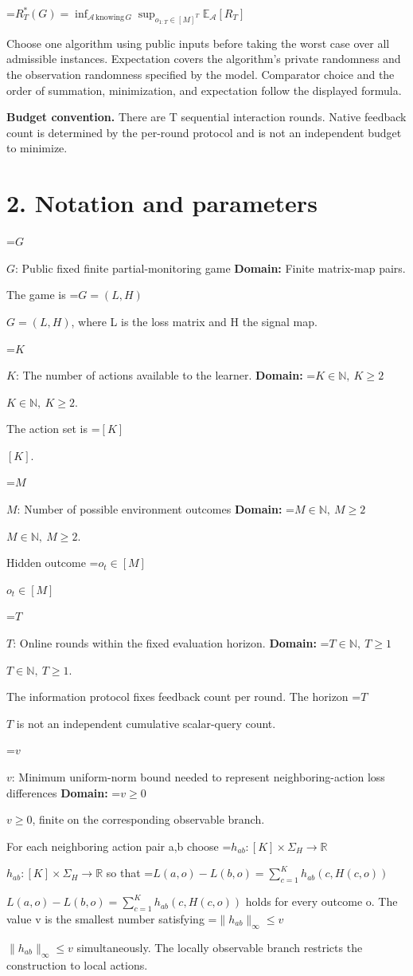 \documentclass[10pt,a4paper]{article}
\newcommand{\AtlasMath}[1]{\par\begingroup\centering\setbox0=\hbox{$\displaystyle #1$}\ifdim\wd0>1.4\linewidth\typeout{ATLAS WIDE FORMULA: \the\wd0}\fi\ifdim\wd0>\linewidth\resizebox{\linewidth}{!}{\box0}\else\box0\fi\par\endgroup}
\newcommand{\AtlasInlineMath}[1]{\begingroup\setbox0=\hbox{$#1$}\ifdim\wd0>.4\linewidth\endgroup\AtlasMath{#1}\else\endgroup$#1$\fi}
\begin{document}
\AtlasMath{R_T^*(G)=\inf_{\mathcal{A}\,\mathrm{knowing}\,G}\sup_{o_{1:T}\in[M]^T}\mathbb{E}_{\mathcal{A}}[R_T]}


Choose one algorithm using public inputs before taking the worst case over all admissible instances. Expectation covers the algorithm's private randomness and the observation randomness specified by the model. Comparator choice and the order of summation, minimization, and expectation follow the displayed formula.

\textbf{Budget convention.} There are T sequential interaction rounds. Native feedback count is determined by the per-round protocol and is not an independent budget to minimize.

\section{2. Notation and parameters}
\AtlasInlineMath{G}: Public fixed finite partial-monitoring game \textbf{Domain:} Finite matrix-map pairs.

The game is \AtlasInlineMath{G=(L,H)}, where L is the loss matrix and H the signal map.

\AtlasInlineMath{K}: The number of actions available to the learner. \textbf{Domain:} \AtlasInlineMath{K\in\mathbb N,\ K\ge2}.

The action set is \AtlasInlineMath{[K]}.

\AtlasInlineMath{M}: Number of possible environment outcomes \textbf{Domain:} \AtlasInlineMath{M\in\mathbb N,\ M\ge2}.

Hidden outcome \AtlasInlineMath{o_t\in[M]}

\AtlasInlineMath{T}: Online rounds within the fixed evaluation horizon. \textbf{Domain:} \AtlasInlineMath{T\in\mathbb N,\ T\ge1}.

The information protocol fixes feedback count per round. The horizon \AtlasInlineMath{T} is not an independent cumulative scalar-query count.

\AtlasInlineMath{v}: Minimum uniform-norm bound needed to represent neighboring-action loss differences \textbf{Domain:} \AtlasInlineMath{v\ge0}, finite on the corresponding observable branch.

For each neighboring action pair a,b choose \AtlasInlineMath{h_{ab}:[K]\times\Sigma_H\to\mathbb R} so that \AtlasInlineMath{L(a,o)-L(b,o)=\sum_{c=1}^K h_{ab}(c,H(c,o))} holds for every outcome o. The value v is the smallest number satisfying \AtlasInlineMath{\|h_{ab}\|_\infty\le v} simultaneously. The locally observable branch restricts the construction to local actions.
\end{document}
